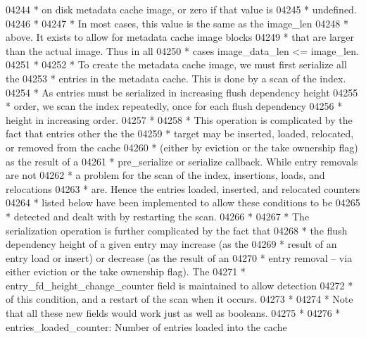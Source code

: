 \begin{DoxyCode}
04244 \textcolor{comment}{ *      on disk metadata cache image, or zero if that value is }
04245 \textcolor{comment}{ *      undefined.}
04246 \textcolor{comment}{ *}
04247 \textcolor{comment}{ *      In most cases, this value is the same as the image\_len}
04248 \textcolor{comment}{ *      above.  It exists to allow for metadata cache image blocks}
04249 \textcolor{comment}{ *      that are larger than the actual image.  Thus in all }
04250 \textcolor{comment}{ *      cases image\_data\_len <= image\_len.}
04251 \textcolor{comment}{ *}
04252 \textcolor{comment}{ * To create the metadata cache image, we must first serialize all the}
04253 \textcolor{comment}{ * entries in the metadata cache.  This is done by a scan of the index.}
04254 \textcolor{comment}{ * As entries must be serialized in increasing flush dependency height}
04255 \textcolor{comment}{ * order, we scan the index repeatedly, once for each flush dependency}
04256 \textcolor{comment}{ * height in increasing order.}
04257 \textcolor{comment}{ *}
04258 \textcolor{comment}{ * This operation is complicated by the fact that entries other the the}
04259 \textcolor{comment}{ * target may be inserted, loaded, relocated, or removed from the cache }
04260 \textcolor{comment}{ * (either by eviction or the take ownership flag) as the result of a }
04261 \textcolor{comment}{ * pre\_serialize or serialize callback.  While entry removals are not }
04262 \textcolor{comment}{ * a problem for the scan of the index, insertions, loads, and relocations}
04263 \textcolor{comment}{ * are.  Hence the entries loaded, inserted, and relocated counters }
04264 \textcolor{comment}{ * listed below have been implemented to allow these conditions to be }
04265 \textcolor{comment}{ * detected and dealt with by restarting the scan.}
04266 \textcolor{comment}{ *}
04267 \textcolor{comment}{ * The serialization operation is further complicated by the fact that }
04268 \textcolor{comment}{ * the flush dependency height of a given entry may increase (as the }
04269 \textcolor{comment}{ * result of an entry load or insert) or decrease (as the result of an }
04270 \textcolor{comment}{ * entry removal -- via either eviction or the take ownership flag).  The}
04271 \textcolor{comment}{ * entry\_fd\_height\_change\_counter field is maintained to allow detection}
04272 \textcolor{comment}{ * of this condition, and a restart of the scan when it occurs.}
04273 \textcolor{comment}{ *}
04274 \textcolor{comment}{ * Note that all these new fields would work just as well as booleans.}
04275 \textcolor{comment}{ *}
04276 \textcolor{comment}{ * entries\_loaded\_counter: Number of entries loaded into the cache }

\end{DoxyCode}

